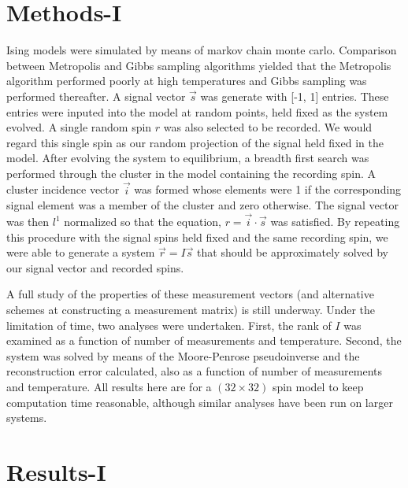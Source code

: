 \documentclass{article} %
\begin{document}
\section{Methods-I}
Ising models were simulated by means of markov chain monte carlo.
\cite{MacKay2003}\cite{Schroeder1999} Comparison
between Metropolis and Gibbs sampling algorithms yielded that the Metropolis
algorithm performed poorly at high temperatures and Gibbs sampling was
performed thereafter.  A signal vector $\vec{s}$ was generate with [-1, 1] entries. These
entries were inputed into the model at random points, held fixed as the system
evolved. A single random spin $r$ was also selected to be recorded. We would regard
this single spin as our random projection of the signal held fixed in the model.
 After evolving the system to equilibrium, a breadth first search was performed
through the cluster in the model containing the recording spin.  A cluster
incidence vector $\vec{i}$ was formed whose elements were 1 if the corresponding signal
element was a member of the cluster and zero otherwise.  The signal vector was
then $l^1$ normalized so that the equation, $r = \vec{i} \cdot \vec{s}$ was satisfied.  By
repeating this procedure with the signal spins held fixed and the same recording
spin, we were able to generate a system $\vec{r} = I\vec{s}$ that should be approximately
solved by our signal vector and recorded spins.

A full study of the properties of these measurement vectors (and alternative
schemes at constructing a measurement matrix) is still underway.  Under the
limitation of time, two analyses were undertaken.  First, the rank of $I$ was
examined as a function of number of measurements and temperature. Second, the
system was solved by means of the Moore-Penrose pseudoinverse and the reconstruction
error calculated, also as a function of number of measurements and temperature.
All results here are for a $(32\times 32)$ spin model to keep computation time
reasonable, although similar analyses have been run on larger systems.

\section{Results-I}
\end{document}
